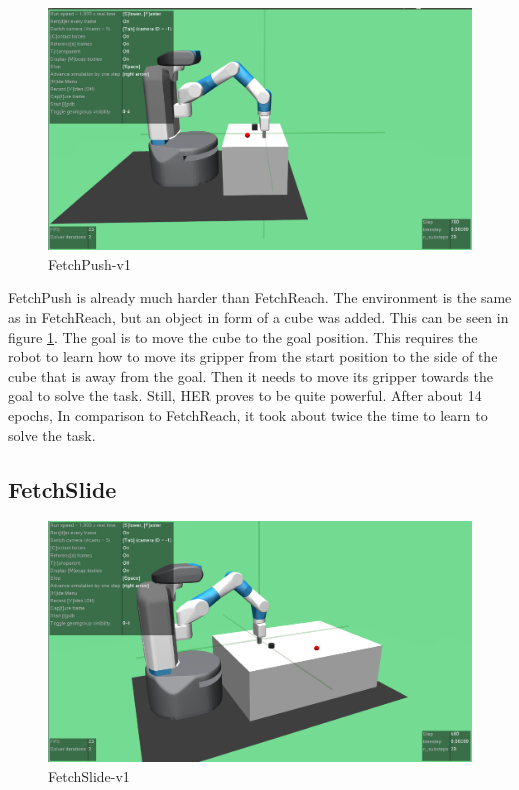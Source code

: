 \begin{figure} [h]
	
	\centering
	\includegraphics[width=1\textwidth]{figures/FetchPush-v1.pdf}
	\caption{FetchPush-v1}
	\label{push1}
\end{figure}

FetchPush is already much harder than FetchReach. The environment is the same as in FetchReach, but an object in form of a cube was added. This can be seen in figure \ref{push1}. The goal is to move the cube to the goal position. This requires the robot to learn how to move its gripper from the start position to the side of the cube that is away from the goal. Then it needs to move its gripper towards the goal to solve the task. Still, HER proves to be quite powerful. After about 14 epochs, In comparison to FetchReach, it took about twice the time to learn to solve the task.





\subsection{FetchSlide}

\begin{figure} [h]
	
	\centering
	\includegraphics[width=1\textwidth]{figures/FetchSlide-v1.pdf}
	\caption{FetchSlide-v1}
	\label{slide1}
\end{figure}

